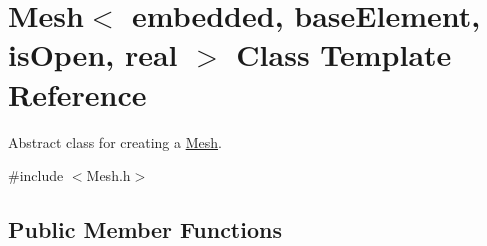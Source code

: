 \hypertarget{class_mesh}{}\section{Mesh$<$ embedded, base\+Element, is\+Open, real $>$ Class Template Reference}
\label{class_mesh}


Abstract class for creating a \hyperlink{class_mesh}{Mesh}.  




{\ttfamily \#include $<$Mesh.\+h$>$}

\subsection*{Public Member Functions}
